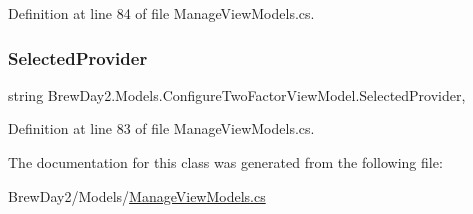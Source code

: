 Definition at line 84 of file Manage\+View\+Models.\+cs.

\mbox{\label{class_brew_day2_1_1_models_1_1_configure_two_factor_view_model_a31e8b62f8906ff16b28c3a29e2c23045}} 
\subsubsection{\texorpdfstring{Selected\+Provider}{SelectedProvider}}
{\footnotesize\ttfamily string Brew\+Day2.\+Models.\+Configure\+Two\+Factor\+View\+Model.\+Selected\+Provider\hspace{0.3cm}{\ttfamily [get]}, {\ttfamily [set]}}



Definition at line 83 of file Manage\+View\+Models.\+cs.



The documentation for this class was generated from the following file\+:\begin{DoxyCompactItemize}
\item 
Brew\+Day2/\+Models/\mbox{\hyperlink{_manage_view_models_8cs}{Manage\+View\+Models.\+cs}}\end{DoxyCompactItemize}
